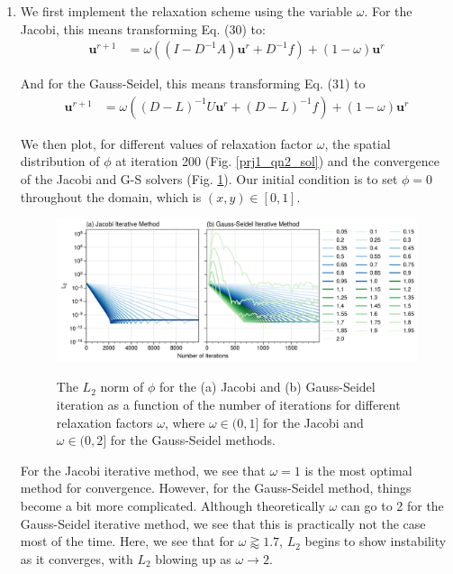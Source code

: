 \begin{enumerate}[label=(\roman*),leftmargin=*,itemsep=0mm]
    \item We first implement the relaxation scheme using the variable $\omega$.  For the Jacobi, this means transforming Eq. (30) to:
    \begin{align}
        \mathbf{u}^{r+1} &= \omega((I-D^{-1}A)\mathbf{u}^r + D^{-1}f) + (1-\omega) \mathbf{u}^r
    \end{align}
    
    And for the Gauss-Seidel, this means transforming Eq. (31) to
    \begin{align}
        \mathbf{u}^{r+1} &= \omega((D-L)^{-1}U\mathbf{u}^r + (D-L)^{-1}f) + (1-\omega)\mathbf{u}^r
    \end{align}
    
    We then plot, for different values of relaxation factor $\omega$, the spatial distribution of $\phi$ at iteration 200 (Fig. \ref{prj1_qn2_sol}) and the convergence of the Jacobi and G-S solvers (Fig. \ref{prj1_qn2b_converge}).  Our initial condition is to set $\phi=0$ throughout the domain, which is $(x,y) \in [0,1]$.

    \begin{figure}[h!]
    \centering
    \includegraphics[width=\textwidth]{figures/prj1_qn2b_converge.png}\\
    \caption{The $L_2$ norm of $\phi$ for the (a) Jacobi and (b) Gauss-Seidel iteration as a function of the number of iterations for different relaxation factors $\omega$, where $\omega \in (0,1]$ for the Jacobi and $\omega\in(0,2]$ for the Gauss-Seidel methods.}
    \label{prj1_qn2b_converge}
    \end{figure}
    
    For the Jacobi iterative method, we see that $\omega = 1$ is the most optimal method for convergence.  However, for the Gauss-Seidel method, things become a bit more complicated.  Although theoretically $\omega$ can go to 2 for the Gauss-Seidel iterative method, we see that this is practically not the case most of the time.  Here, we see that for $\omega \gtrapprox 1.7$, $L_2$ begins to show instability as it converges, with $L_2$ blowing up as $\omega \rightarrow 2$.
    

\end{enumerate}
